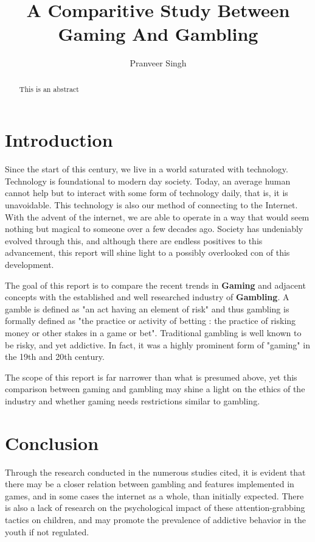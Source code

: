 \documentclass{article}
\title{A Comparitive Study Between Gaming And Gambling}
\author{Pranveer Singh}
\begin{document}
\maketitle

\begin{abstract}
This is an abstract
\end{abstract}

\section{Introduction}
Since the start of this century, we live in a world saturated with technology. Technology is foundational to modern day society. Today, an average human cannot help but to interact with some form of technology daily, that is, it is unavoidable.
This technology is also our method of connecting to the Internet. With the advent of the internet, we are able to operate in a way that would seem nothing but magical to someone over a few decades ago. Society has undeniably evolved through this, and although there are endless positives to this advancement, this report will shine light to a possibly overlooked con of this development.

The goal of this report is to compare the recent trends in \textbf{Gaming} and adjacent concepts with the established and well researched industry of \textbf{Gambling}. A gamble is defined as "an act having an element of risk" and thus gambling is formally defined as "the practice or activity of betting : the practice of risking money or other stakes in a game or bet". Traditional gambling is well known to be risky, and yet addictive. In fact, it was a highly prominent form of "gaming" in the 19th and 20th century. 

The scope of this report is far narrower than what is presumed above, yet this comparison between gaming and gambling may shine a light on the ethics of the industry and whether gaming needs restrictions similar to gambling.


\section{Conclusion}
Through the research conducted in the numerous studies cited, it is evident that there may be a closer relation between gambling and features implemented in games, and in some cases the internet as a whole, than initially expected. There is also a lack of research on the psychological impact of these attention-grabbing tactics on children, and may promote the prevalence of addictive behavior in the youth if not regulated. 




\end{document}
